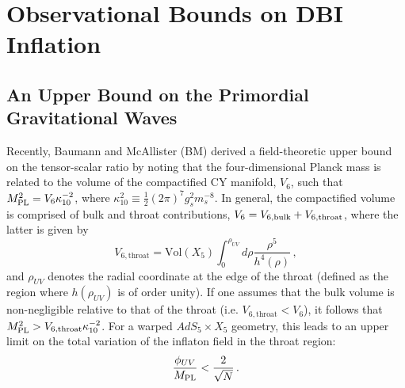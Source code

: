 \renewcommand{\CVSrevision}{\version$Id: dbi.tex,v 1.7 2009/07/20 13:27:06 ith Exp $}
% 

\chapter{Observational Bounds on DBI Inflation}
\label{ch:dbi}
% 
% 
% 

% 
% 
\section{An Upper Bound on the Primordial Gravitational Waves}
% 
\label{sec:upper}
%

Recently, Baumann and McAllister (BM) \cite{bmpaper} 
derived a field-theoretic upper bound on the tensor-scalar ratio 
by noting that the four-dimensional Planck mass is related 
to the volume of the compactified CY manifold, $V_6$, such that 
$M_{\mathrm{PL}}^2=V_6 \kappa_{10}^{-2}$, where $\kappa_{10}^2 \equiv 
\frac{1}{2} (2\pi )^7 g_s^2 m_s^{-8}$.
In general, the compactified volume 
is comprised of bulk and throat contributions, 
$V_6 = V_{6,{\rm bulk}}+V_{6,{\rm throat}}$, where the latter is 
given by
\begin{equation}
\label{throatvolume}
V_{6,\mathrm{throat}} = \mathrm{Vol}(X_5)  
\int_0^{\rho_{UV}} d\rho \frac{\rho^5}{h^4(\rho )} \,,
\end{equation}
and $\rho_{UV}$ denotes the radial coordinate at 
the edge of the throat (defined as the region 
where $h (\rho_{UV})$ is of order unity). 
If one assumes that the bulk volume is 
non-negligible relative to 
that of the throat (i.e. $V_{6,\mathrm{throat}} < V_{6}$), 
it follows that $M_{\mathrm{PL}}^2> V_{6,\mathrm{throat}}\kappa_{10}^{-2}$. 
For a warped $AdS_5 \times X_5$ geometry, this leads to an 
upper limit on the total variation of the inflaton field in 
the throat region:
\begin{equation}
\label{BMbound}
\frac{\phi_{UV}}{M_{\mathrm{PL}}}   < \frac{2}{\sqrt{N}} \,.
\end{equation}

